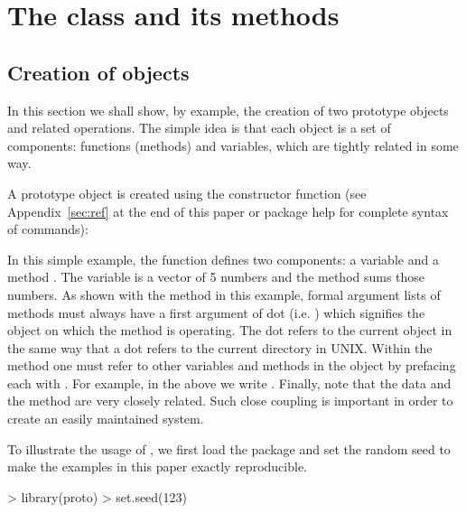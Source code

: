 \documentclass{Z}
\begin{document}

\section[The class "proto" and its methods]{The class  and its methods}
\label{sec:proto-class}

\subsection[Creation of "proto" objects]{Creation of  objects}
\label{sec:proto}

In this section we shall show, by example, the creation of two
prototype objects and related operations.  The simple idea is that
each  object is a set of components: functions (methods)
and variables, which are tightly related in some way.

A prototype object is created using the constructor function
 (see Appendix~\ref{sec:ref} at the end of this paper or
 package help for complete syntax of commands):


In this simple example, the  function defines two
components: a variable  and a method .  The variable
 is a vector of 5 numbers and the method sums those numbers.
As shown with the  method in this example, formal argument
lists of methods must always have a first argument of dot
(i.e. )  which signifies the object on which the method is
operating.  The dot refers to the current object in the same way that
a dot refers to the current directory in UNIX.  Within the method one
must refer to other variables and methods in the object by prefacing
each with .  For example, in the above we write
.  Finally, note that the data and the method are very
closely related.  Such close coupling is important in order to create
an easily maintained system.

To illustrate the usage of , we first load the package and
set the random seed to make the examples in this paper exactly
reproducible.

\begin{Schunk}
\begin{Sinput}
> library(proto)
> set.seed(123)
\end{Sinput}
\end{Schunk}
\end{document}
